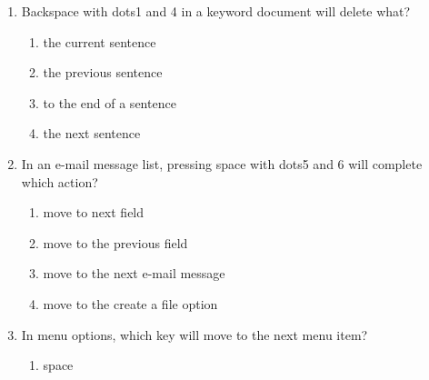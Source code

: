 \documentclass[10pt,letterpaper,twoside]{report}
\begin{document}
{{{{\begin{enumerate}
	      \begin{enumerate}
		      \item previous
		            
		      \item back
		            
		      \item advance
		            
		      \item next
		            
		            
	      \end{enumerate}
	\item Backspace with dots1 and 4 in a keyword document will delete what?
	      
	      \begin{enumerate}
		      \item the current sentence
		            
		      \item the previous sentence
		            
		      \item to the end of a sentence
		            
		      \item the next sentence
		            
		            
	      \end{enumerate}
	\item In an e-mail message list, pressing space with dots5 and 6 will complete which action?
	      
	      \begin{enumerate}
		      \item move to next field
		            
		      \item move to the previous field
		            
		      \item move to the next e-mail message
		            
		      \item move to the create a file option
		            
		            
	      \end{enumerate}
	\item In menu options, which key will move to the next menu item?
	      
	      \begin{enumerate}
		      \item space
		            

\end{enumerate}
\end{enumerate}}}}}
\end{document}
